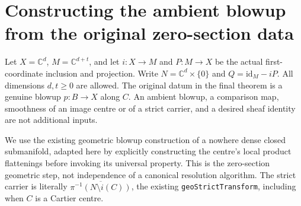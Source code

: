\chapter{Constructing the ambient blowup from the original zero-section data}

Let $X=\mathbb C^d$, $M=\mathbb C^{d+t}$, and let $i:X\to M$ and
$P:M\to X$ be the actual first-coordinate inclusion and projection. Write
$N=\mathbb C^d\times\{0\}$ and $Q=\mathrm{id}_M-iP$. All dimensions
$d,t\geq0$ are allowed. The original datum in the final theorem is a
genuine blowup $p:B\to X$ along $C$. An ambient blowup, a comparison map,
smoothness of an image centre or of a strict carrier, and a desired sheaf
identity are not additional inputs.

We use the existing geometric blowup construction of a nowhere dense
closed submanifold, adapted here by explicitly constructing the centre's
local product flattenings before invoking its universal property. This
is the zero-section geometric step, not independence of a canonical
resolution algorithm. The strict carrier is literally
$\overline{\pi^{-1}(N\setminus i(C))}$, the existing
\texttt{geoStrictTransform}, including when $C$ is a Cartier centre.


